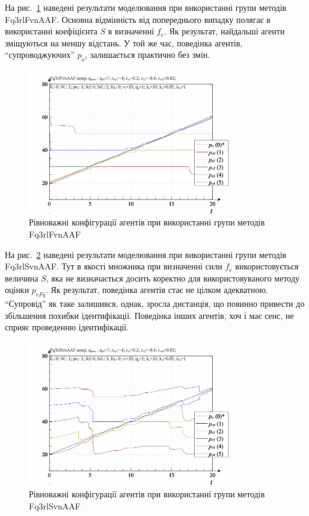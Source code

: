 На рис.~\ref{atu:f:qls_ramp_Fq3rlFvnAAF} наведені результати моделювання
при використанні групи методів Fq3rlFvnAAF. Основна відмінність від
попереднього випадку полягає в використанні коефіцієнта
$S$ в визначенні
$f_e$. Як результат, найдальші агенти зміщуються на меншу
відстань. У той же час, поведінка агентів, ``супроводжуючих'' $p_o$, залишається практично без змін.


\begin{figure}[htb!]
  \begin{center}
    \includegraphics[width=0.8\textwidth]{p/ramp/qls-p_t_pi_Fq3rlFvnAAF_ramp.png}
  \end{center}
  \caption{Рівноважні конфігурації агентів при використанні групи методів Fq3rlFvnAAF}
  \label{atu:f:qls_ramp_Fq3rlFvnAAF}
\end{figure}

На рис.~\ref{atu:f:qls_ramp_Fq3rlSvnAAF} наведені результати моделювання при
використанні групи методів Fq3rlSvnAAF. Тут в якості множника при визначенні
сили
$f_e$ використовується величина
$S$, яка не визначається досить коректно для використовуваного
методу оцінки
$p_{eFq}$. Як результат, поведінка агентів стає не цілком
адекватною. ``Супровід'' як таке залишився, однак,
зросла дистанція, що повинно привести до збільшення похибки
ідентифікації. Поведінка інших агентів, хоч і має сенс, не
сприяє проведенню ідентифікації.

\begin{figure}[htb!]
  \begin{center}
    \includegraphics[width=0.8\textwidth]{p/ramp/qls-p_t_pi_Fq3rlSvnAAF_ramp.png}
  \end{center}
  \caption{Рівноважні конфігурації агентів при використанні групи методів Fq3rlSvnAAF}
  \label{atu:f:qls_ramp_Fq3rlSvnAAF}
\end{figure}


